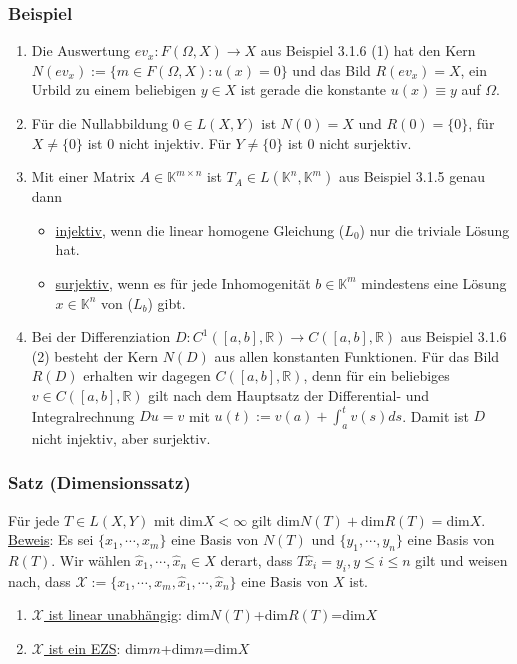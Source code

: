 \subsubsection{Beispiel}
\renewcommand{\labelenumi}{(\arabic{enumi})}
\begin{enumerate}
\item Die Auswertung $ev_x:F(\Omega ,X)\rightarrow X$ aus Beispiel 3.1.6 (1) hat den Kern $N(ev_x):=\{m\in F(\Omega ,X):u(x)=0\}$ und das Bild $R(ev_x)=X$, ein Urbild zu einem beliebigen $y\in X$ ist gerade die konstante $u(x)\equiv y$ auf $\Omega$.
\item Für die Nullabbildung $0\in L(X,Y)$ ist $N(0)=X$ und $R(0)=\{0\}$, für $X\not= \{0\}$ ist $0$ nicht injektiv.  Für $Y\not= \{0\}$ ist $0$ nicht surjektiv.
\item Mit einer Matrix $A\in \mathbb{K}^{m\times n}$ ist $T_A\in L(\mathbb{K}^n,\mathbb{K}^m)$ aus Beispiel 3.1.5 genau dann
\begin{itemize}
\item \underline{injektiv}, wenn die linear homogene Gleichung ($L_0$) nur die triviale Lösung hat.
\item \underline{surjektiv}, wenn es für jede Inhomogenität $b\in\mathbb{K}^m$ mindestens eine Lösung $x\in\mathbb{K}^n$ von ($L_b$) gibt.
\end{itemize}
\item Bei der Differenziation $D:C^1([a,b],\mathbb{R})\rightarrow C([a,b],\mathbb{R})$ aus Beispiel 3.1.6 (2) besteht der Kern $N(D)$ aus allen konstanten Funktionen.  Für das Bild $R(D)$ erhalten wir dagegen $C([a,b],\mathbb{R})$, denn für ein beliebiges $v\in C([a,b],\mathbb{R})$ gilt nach dem Hauptsatz der Differential- und Integralrechnung $Du=v$ mit $u(t):=v(a)+\int_a^t v(s)ds$.  Damit ist $D$ nicht injektiv, aber surjektiv.
\end{enumerate}
\subsubsection{Satz (Dimensionssatz)}
\label{dimension}
Für jede $T\in L(X,Y)$ mit dim$X<\infty$ gilt dim$N(T)+$dim$R(T)=$dim$X$.\\
\underline{Beweis}: Es sei $\{x_1,\cdots ,x_m\}$ eine Basis von $N(T)$ und $\{y_1,\cdots ,y_n\}$ eine Basis von $R(T)$.  Wir wählen $\hat{x}_1,\cdots ,\hat{x}_n \in X$ derart, dass $T\hat{x}_i=y_i,y\leq i\leq n$ gilt und weisen nach, dass $\mathcal{X}:=\{x_1,\cdots ,x_m,\hat{x}_1,\cdots ,\hat{x}_n\}$ eine Basis von $X$ ist.
\renewcommand{\labelenumi}{(\roman{enumi})}
\begin{enumerate}
\item \underline{$\mathcal{X}$ ist linear unabhängig}: dim$N(T)$+dim$R(T)$=dim$X$
\item \underline{$\mathcal{X}$ ist ein EZS}: dim$m$+dim$n$=dim$X$
\end{enumerate}
